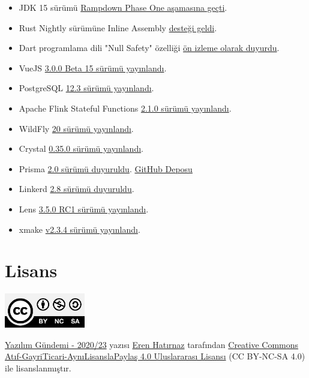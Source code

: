 \documentclass[11pt]{article}
\begin{document}
\begin{itemize}
\item JDK 15 sürümü \href{https://mail.openjdk.java.net/pipermail/jdk-dev/2020-June/004401.html}{Rampdown Phase One aşamasına geçti}.
\item Rust Nightly sürümüne Inline Assembly \href{https://blog.rust-lang.org/inside-rust/2020/06/08/new-inline-asm.html}{desteği geldi}.
\item Dart programlama dili "Null Safety" özelliği \href{https://medium.com/dartlang/announcing-sound-null-safety-defd2216a6f3}{ön izleme olarak duyurdu}.
\item VueJS \href{https://github.com/vuejs/vue-next/releases/tag/v3.0.0-beta.15}{3.0.0 Beta 15 sürümü yayınlandı}.
\item PostgreSQL \href{http://jepsen.io/analyses/postgresql-12.3}{12.3 sürümü yayınlandı}.
\item Apache Flink Stateful Functions \href{https://flink.apache.org/news/2020/06/09/release-statefun-2.1.0.html}{2.1.0 sürümü yayınlandı}.
\item WildFly \href{https://wildfly.org/news/2020/06/08/WildFly20-Final-Released/}{20 sürümü yayınlandı}.
\item Crystal \href{https://crystal-lang.org/2020/06/09/crystal-0.35.0-released.html}{0.35.0 sürümü yayınlandı}.
\item Prisma \href{https://www.prisma.io/blog/announcing-prisma-2-n0v98rzc8br1}{2.0 sürümü duyuruldu}. \href{https://github.com/prisma/prisma}{GitHub Deposu}
\item Linkerd \href{https://linkerd.io/2020/06/09/announcing-linkerd-2.8/}{2.8 sürümü duyuruldu}.
\item Lens \href{https://github.com/lensapp/lens/releases/tag/v3.5.0-rc.1}{3.5.0 RC1 sürümü yayınlandı}.
\item xmake \href{https://github.com/xmake-io/xmake/wiki/xmake-v2.3.4-released,-Better-toolchain-support}{v2.3.4 sürümü yayınlandı}.
\end{itemize}
\section{Lisans}
\label{sec:orgb06b9e6}
\begin{center}
\begin{center}
\includegraphics[height=1.5cm]{../../../img/CC_BY-NC-SA_4.0.png}
\end{center}

\href{yazilim-gundemi-2020-23.pdf}{Yazılım Gündemi - 2020/23} yazısı \href{https://erenhatirnaz.github.io}{Eren Hatırnaz} tarafından \href{http://creativecommons.org/licenses/by-nc-sa/4.0/}{Creative Commons
Atıf-GayriTicari-AynıLisanslaPaylaş 4.0 Uluslararası Lisansı} (CC BY-NC-SA 4.0)
ile lisanslanmıştır.
\end{center}
\end{document}
